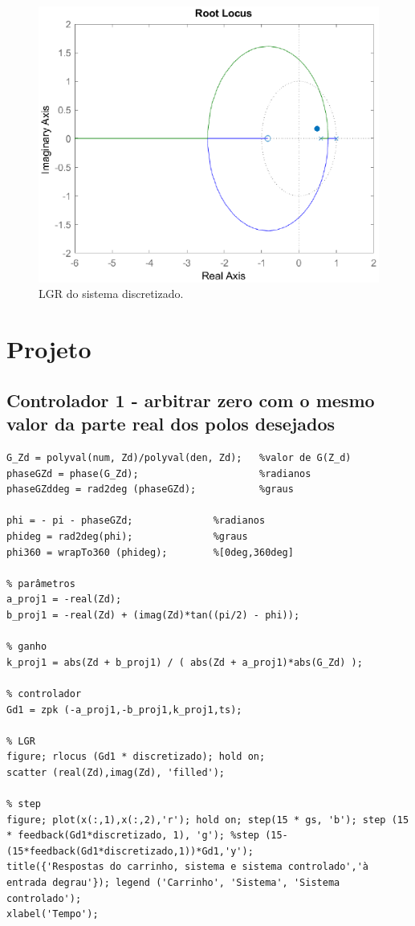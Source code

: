\documentclass{article}
\begin{document}
\begin{figure}[H]
    \centering
        \includegraphics[width=.8\linewidth]{images/Matlab/identifica_02.eps}
        \caption{LGR do sistema discretizado.}\label{fig:lgr_discreto}
\end{figure}


\section{Projeto}

\subsection*{Controlador 1 - arbitrar zero com o mesmo valor da parte real dos polos desejados}

\begin{lstlisting}
G_Zd = polyval(num, Zd)/polyval(den, Zd);   %valor de G(Z_d)
phaseGZd = phase(G_Zd);                     %radianos
phaseGZddeg = rad2deg (phaseGZd);           %graus

phi = - pi - phaseGZd;              %radianos
phideg = rad2deg(phi);              %graus
phi360 = wrapTo360 (phideg);        %[0deg,360deg]

% parâmetros
a_proj1 = -real(Zd);
b_proj1 = -real(Zd) + (imag(Zd)*tan((pi/2) - phi));

% ganho
k_proj1 = abs(Zd + b_proj1) / ( abs(Zd + a_proj1)*abs(G_Zd) );

% controlador
Gd1 = zpk (-a_proj1,-b_proj1,k_proj1,ts);

% LGR
figure; rlocus (Gd1 * discretizado); hold on;
scatter (real(Zd),imag(Zd), 'filled');

% step
figure; plot(x(:,1),x(:,2),'r'); hold on; step(15 * gs, 'b'); step (15 * feedback(Gd1*discretizado, 1), 'g'); %step (15-(15*feedback(Gd1*discretizado,1))*Gd1,'y');
title({'Respostas do carrinho, sistema e sistema controlado','à entrada degrau'}); legend ('Carrinho', 'Sistema', 'Sistema controlado');
xlabel('Tempo');
\end{lstlisting}
\end{document}

